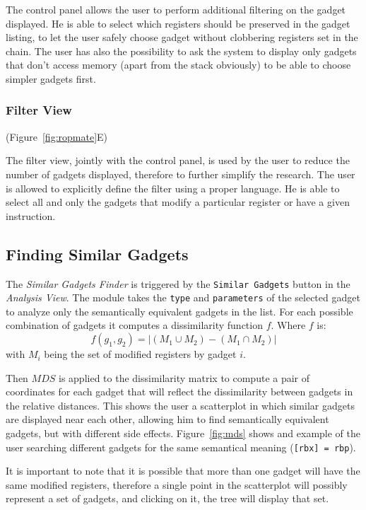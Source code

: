 \documentclass[twocolumn, 11pt]{article}
\begin{document}
The control panel allows the user to perform additional filtering on the gadget displayed. He is able to select which registers should be preserved in the gadget listing, to let the user safely choose gadget without clobbering registers set in the chain. The user has also the possibility to ask the system to display only gadgets that don't access memory (apart from the stack obviously) to be able to choose simpler gadgets first.

\subsubsection{Filter View}
(Figure~\ref{fig:ropmate}E)

The filter view, jointly with the control panel, is used by the user to reduce the number of gadgets displayed, therefore to further simplify the research. The user is allowed to explicitly define the filter using a proper language. He is able to select all and only the gadgets that modify a particular register or have a given instruction.

\subsection{Finding Similar Gadgets}
The \textit{Similar Gadgets Finder} is triggered by the \texttt{Similar Gadgets} button in the \textit{Analysis View}. The module takes the \texttt{type} and \texttt{parameters} of the selected gadget to analyze only the semantically equivalent gadgets in the list. For each possible combination of gadgets it computes a dissimilarity function $f$. Where $f$ is:
$$
f(g_1, g_2) = |(M_1 \cup M_2) - (M_1 \cap M_2)|
$$
with $M_i$ being the set of modified registers by gadget $i$.

Then $MDS$ is applied to the dissimilarity matrix to compute a pair of coordinates for each gadget that will reflect the dissimilarity between gadgets in the relative distances. This shows the user a scatterplot in which similar gadgets are displayed near each other, allowing him to find semantically equivalent gadgets, but with different side effects. Figure~\ref{fig:mds} shows and example of the user searching different gadgets for the same semantical meaning (\texttt{[rbx] = rbp}).

It is important to note that it is possible that more than one gadget will have the same modified registers, therefore a single point in the scatterplot will possibly represent a set of gadgets, and clicking on it, the tree will display that set.
\end{document}
